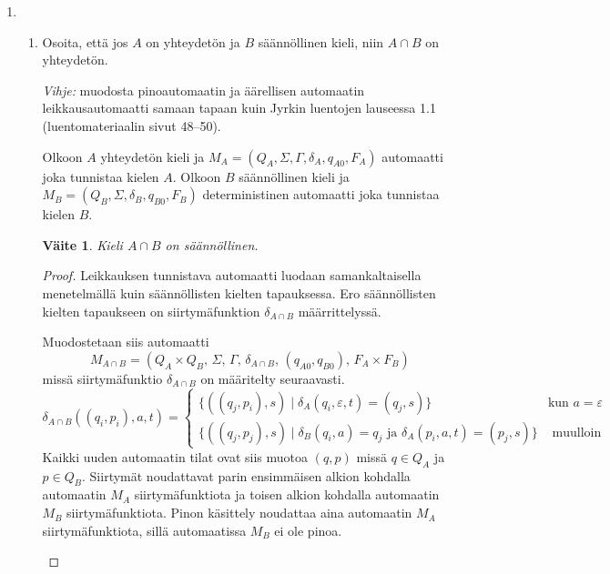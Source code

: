 \documentclass[a4paper,11pt, draft]{article}
\newtheorem*{claim}{Väite}
\newcommand{\ve}{\varepsilon}
\newenvironment{automata}[1][2.8]%
{\begin{tikzpicture}[->,>=stealth',shorten >=1pt,auto,node distance=#1cm,semithick]}%
{\end{tikzpicture}}
\begin{document}
\begin{enumerate}
  \item
    \begin{enumerate}
    \item
      Osoita, että jos $A$ on yhteydetön ja $B$ säännöllinen kieli, niin
      $A\cap B$ on yhteydetön.

      \emph{Vihje:} muodosta pinoautomaatin ja äärellisen automaatin
      leikkausautomaatti samaan tapaan kuin Jyrkin luentojen lauseessa 1.1
      (luentomateriaalin sivut 48--50).

      Olkoon $A$ yhteydetön kieli ja $M_A = (Q_A, \Sigma, \Gamma, \delta_A,
      q_{A0}, F_A)$ automaatti joka tunnistaa kielen $A$. Olkoon $B$
      säännöllinen kieli ja $M_B = (Q_B, \Sigma, \delta_B, q_{B0}, F_B)$
      deterministinen automaatti joka tunnistaa kielen $B$.
      \begin{claim}
         Kieli $A \cap B$ on säännöllinen.
      \end{claim}
      \begin{proof}
        Leikkauksen tunnistava automaatti luodaan samankaltaisella
        menetelmällä kuin säännöllisten kielten tapauksessa. Ero säännöllisten
        kielten tapaukseen on siirtymäfunktion $\delta_{A \cap B}$
        määrrittelyssä.

        Muodostetaan siis automaatti
        \begin{equation*}
          M_{A \cap B} = (Q_A \times Q_B \text{, } \Sigma \text{, } \Gamma
          \text{, } \delta_{A \cap B} \text{, } (q_{A0}, q_{B0}) \text{, } F_A
          \times F_B)
        \end{equation*}
        missä siirtymäfunktio $\delta_{A \cap B}$ on määritelty seuraavasti.
%
        \begin{equation*}
          \delta_{A \cap B}((q_i, p_i), a, t) = 
          \begin{cases}
            \{((q_j, p_i),s) \mid \delta_A(q_i, \ve, t) = (q_j, s)\} & \text{
              kun } a = \ve \\

            \{((q_j, p_j),s) \mid \delta_B(q_i, a) = q_j \text{ ja }
            \delta_A(p_i, a, t) = (p_j, s)\} & \text{ muulloin}
          \end{cases}
        \end{equation*}
%
        Kaikki uuden automaatin tilat ovat siis muotoa $(q, p)$ missä $q \in
        Q_A$ ja $p \in Q_B$. Siirtymät noudattavat parin ensimmäisen alkion
        kohdalla automaatin $M_A$ siirtymäfunktiota ja toisen alkion kohdalla
        automaatin $M_B$ siirtymäfunktiota. Pinon käsittely noudattaa aina
        automaatin $M_A$ siirtymäfunktiota, sillä automaatissa $M_B$ ei ole
        pinoa.
%
        \begin{center}
\end{center}
\end{proof}
\end{enumerate}
\end{enumerate}
\end{document}

